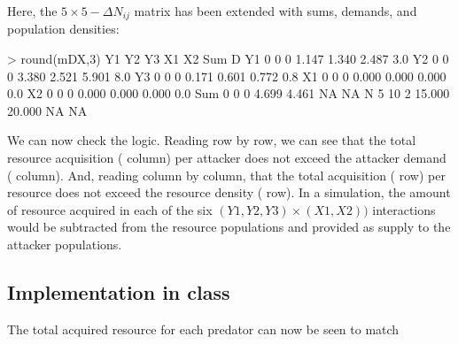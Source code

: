 Here, the $5\times5 -\Delta N_{ij}$  matrix has been extended with sums, demands, and population densities:
\begin{rscript}
> round(mDX,3)
    Y1 Y2 Y3     X1     X2   Sum   D
Y1   0  0  0  1.147  1.340 2.487 3.0
Y2   0  0  0  3.380  2.521 5.901 8.0
Y3   0  0  0  0.171  0.601 0.772 0.8
X1   0  0  0  0.000  0.000 0.000 0.0
X2   0  0  0  0.000  0.000 0.000 0.0
Sum  0  0  0  4.699  4.461    NA  NA
N    5 10  2 15.000 20.000    NA  NA
\end{rscript}

\noindent We can now check the logic. Reading row by row, we can see that the total resource acquisition ( column) per attacker does not exceed the attacker demand ( column). And, reading column by column, that the total  acquisition ( row) per resource does not exceed the resource density ( row). In a simulation, the amount of resource acquired in each of the six $(Y1, Y2, Y3)\times (X1, X2))$ interactions would be subtracted from the resource populations and provided as supply to the attacker populations.

\subsection {Implementation in  class} 
The total acquired resource for each predator can now be seen to match